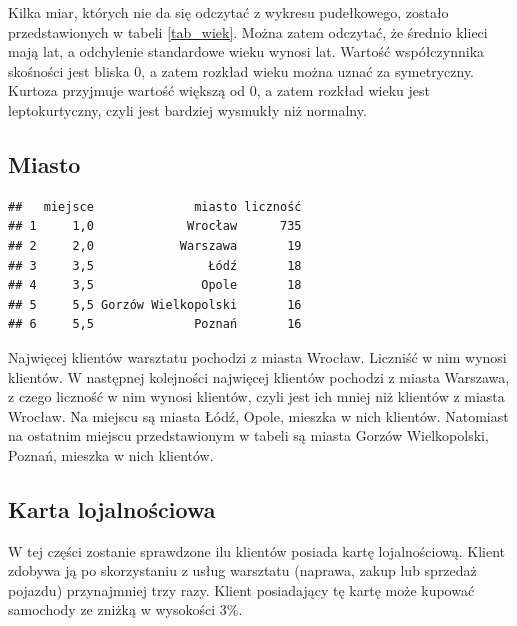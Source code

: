 \documentclass{article}\usepackage[]{graphicx}\usepackage[]{xcolor}
\makeatletter
\newenvironment{kframe}{%
 \def\at@end@of@kframe{}%
 \ifinner\ifhmode%
  \def\at@end@of@kframe{\end{minipage}}%
  \begin{minipage}{\columnwidth}%
 \fi\fi%
 \def\FrameCommand##1{\hskip\@totalleftmargin \hskip-\fboxsep
 \colorbox{shadecolor}{##1}\hskip-\fboxsep
     \hskip-\linewidth \hskip-\@totalleftmargin \hskip\columnwidth}%
 \MakeFramed {\advance\hsize-\width
   \@totalleftmargin\z@ \linewidth\hsize
   \@setminipage}}%
 {\par\unskip\endMakeFramed%
 \at@end@of@kframe}
\newenvironment{knitrout}{}{} %
\makeatother
\begin{document}
Kilka miar, których nie da się odczytać z wykresu pudełkowego, zostało przedstawionych w tabeli \ref{tab_wiek}. Można zatem odczytać, że średnio klieci mają  lat, a odchylenie standardowe wieku wynosi  lat. Wartość współczynnika skośności jest bliska 0, a zatem rozkład wieku można uznać za symetryczny. Kurtoza przyjmuje wartość większą od 0, a zatem rozkład wieku jest leptokurtyczny, czyli jest bardziej wysmukły niż normalny.

\subsection{Miasto}
\begin{knitrout}
\color{fgcolor}\begin{kframe}
\begin{verbatim}
##   miejsce              miasto liczność
## 1     1,0             Wrocław      735
## 2     2,0            Warszawa       19
## 3     3,5                Łódź       18
## 4     3,5               Opole       18
## 5     5,5 Gorzów Wielkopolski       16
## 6     5,5              Poznań       16
\end{verbatim}
\end{kframe}
\end{knitrout}

Najwięcej klientów warsztatu pochodzi z miasta Wrocław. Liczniść w nim wynosi  klientów. W następnej kolejności najwięcej klientów pochodzi z miasta Warszawa, z czego liczność w nim wynosi  klientów, czyli jest ich  mniej niż klientów z miasta Wrocław. Na miejscu  są miasta Łódź, Opole, mieszka w nich  klientów. Natomiast na ostatnim miejscu przedstawionym w tabeli są miasta Gorzów Wielkopolski, Poznań, mieszka w nich  klientów.

\subsection{Karta lojalnościowa}

W tej części zostanie sprawdzone ilu klientów posiada kartę lojalnościową. Klient zdobywa ją po skorzystaniu z usług warsztatu (naprawa, zakup lub sprzedaż pojazdu) przynajmniej trzy razy. Klient posiadający tę kartę może kupować samochody ze zniżką w wysokości 3\%.
\end{document}
